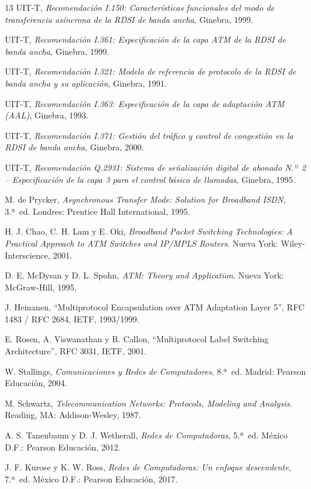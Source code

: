 \documentclass[12pt,a4paper]{article}
\begin{document}
\begin{thebibliography}{13}
    \footnotesize
    \setlength{\itemsep}{2pt}
    \setlength{\parskip}{0pt}
    UIT-T, \textit{Recomendación I.150: Características funcionales del modo de transferencia asíncrona de la RDSI de banda ancha}, Ginebra, 1999.

    UIT-T, \textit{Recomendación I.361: Especificación de la capa ATM de la RDSI de banda ancha}, Ginebra, 1999.

    UIT-T, \textit{Recomendación I.321: Modelo de referencia de protocolo de la RDSI de banda ancha y su aplicación}, Ginebra, 1991.

    UIT-T, \textit{Recomendación I.363: Especificación de la capa de adaptación ATM (AAL)}, Ginebra, 1993.

    UIT-T, \textit{Recomendación I.371: Gestión del tráfico y control de congestión en la RDSI de banda ancha}, Ginebra, 2000.

    UIT-T, \textit{Recomendación Q.2931: Sistema de señalización digital de abonado N.º~2 -- Especificación de la capa 3 para el control básico de llamadas}, Ginebra, 1995.

    M. de Prycker, \textit{Asynchronous Transfer Mode: Solution for Broadband ISDN}, 3.ª~ed. Londres: Prentice Hall International, 1995.

    H. J. Chao, C. H. Lam y E. Oki, \textit{Broadband Packet Switching Technologies: A Practical Approach to ATM Switches and IP/MPLS Routers}. Nueva York: Wiley-Interscience, 2001.

    D. E. McDysan y D. L. Spohn, \textit{ATM: Theory and Application}. Nueva York: McGraw-Hill, 1995.

    J. Heinanen, ``Multiprotocol Encapsulation over ATM Adaptation Layer 5'', RFC 1483 / RFC 2684, IETF, 1993/1999.

    E. Rosen, A. Viswanathan y R. Callon, ``Multiprotocol Label Switching Architecture'', RFC 3031, IETF, 2001.

    W. Stallings, \textit{Comunicaciones y Redes de Computadores}, 8.ª~ed. Madrid: Pearson Educación, 2004.

    M. Schwartz, \textit{Telecommunication Networks: Protocols, Modeling and Analysis}. Reading, MA: Addison-Wesley, 1987.

    A. S. Tanenbaum y D. J. Wetherall, \textit{Redes de Computadoras}, 5.ª~ed. México D.F.: Pearson Educación, 2012.

    J. F. Kurose y K. W. Ross, \textit{Redes de Computadoras: Un enfoque descendente}, 7.ª~ed. México D.F.: Pearson Educación, 2017.
\end{thebibliography}
\end{document}
